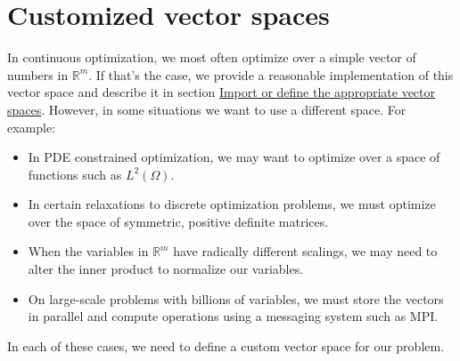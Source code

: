 \documentclass{report}
\newcommand{\re}{\mathbb{R}}
\newcommand{\secimportvs}{Import or define the appropriate vector spaces}
\newcommand{\seccustomvector}{Customized vector spaces}
\begin{document}
\section{\seccustomvector}\label{sec:customvector}

        In continuous optimization, we most often optimize over a simple vector of numbers in $\re^m$.  If that's the case, we provide a reasonable implementation of this vector space and describe it in section \hyperref[sec:importvs]{\secimportvs}.  However, in some situations we want to use a different space.  For example:
\begin{itemize}
    \item In PDE constrained optimization, we may want to optimize over a space of functions such as $L^2(\Omega)$.
    \item In certain relaxations to discrete optimization problems, we must optimize over the space of symmetric, positive definite matrices.
    \item When the variables in $\re^m$ have radically different scalings, we may need to alter the inner product to normalize our variables.
    \item On large-scale problems with billions of variables, we must store the vectors in parallel and compute operations using a messaging system such as MPI.
\end{itemize}
\noindent In each of these cases, we need to define a custom vector space for our problem.
\end{document}
